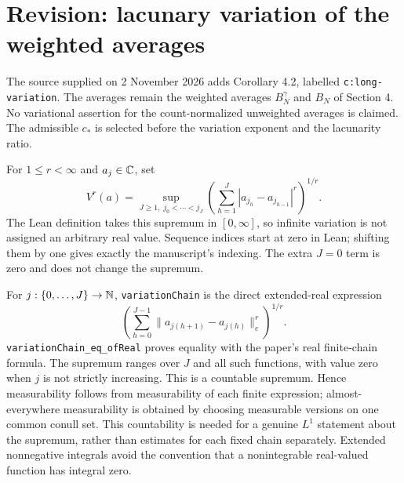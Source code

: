 \section{Revision: lacunary variation of the weighted averages}
The source supplied on 2 November 2026 adds Corollary 4.2, labelled
\texttt{c:long-variation}. The averages remain the weighted averages
$B_N^\gamma$ and $B_N$ of Section 4. No variational assertion for the
count-normalized unweighted averages is claimed. The admissible $c_*$
is selected before the variation exponent and the lacunarity ratio.

\begin{definition}\label{def:variation}
\leanok
For $1\leq r<\infty$ and $a_j\in\mathbb C$, set
\[
 V^r(a)=\sup_{J\geq1,\;j_0<\cdots<j_J}
 \left(\sum_{h=1}^J|a_{j_h}-a_{j_{h-1}}|^r\right)^{1/r}.
\]
The Lean definition takes this supremum in $[0,\infty]$, so infinite
variation is not assigned an arbitrary real value. Sequence indices start
at zero in Lean; shifting them by one gives exactly the manuscript's
indexing. The extra $J=0$ term is zero and does not change the supremum.
\end{definition}
\ifDetailed
For $j:\{0,\ldots,J\}\to\mathbb N$, \texttt{variationChain} is the direct
extended-real expression
\[
 \left(\sum_{h=0}^{J-1}
  \|a_{j(h+1)}-a_{j(h)}\|_e^r\right)^{1/r}.
\]
\texttt{variationChain\_eq\_ofReal} proves equality with the paper's real finite-chain formula. The supremum ranges over $J$ and all such functions, with value zero when
$j$ is not strictly increasing. This is a countable supremum. Hence
measurability follows from measurability of each finite expression;
almost-everywhere measurability is obtained by choosing measurable versions
on one common conull set. This countability is needed for a genuine
$L^1$ statement about the supremum, rather than estimates for each fixed
chain separately. Extended nonnegative integrals avoid the convention
that a nonintegrable real-valued function has integral zero.
\fi

